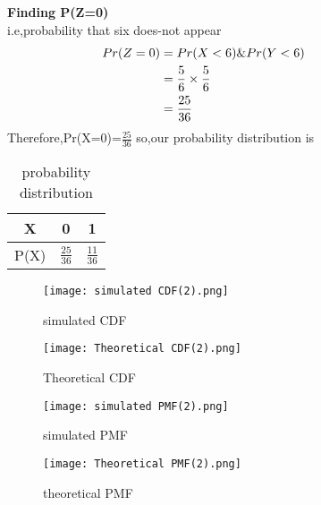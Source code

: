 \documentclass[11pt,a4paper,twocolumn]{article}
\begin{document}
\textbf{Finding P(Z=0)}
\\i.e,probability that six does-not appear
\begin{align*}
\hspace{-3cm}
    Pr(Z=0)&=Pr(X<6)\&Pr(Y<6)\\
    &=\frac{5}{6}\times\frac{5}{6}\\
    &=\frac{25}{36}
\end{align*}
Therefore,Pr(X=0)=$\frac{25}{36}$
so,our probability distribution is
\begin{table}[ht]
    \centering
    \begin{tabular}{|c|c|c|}
    \hline
         X&0&1\\[5pt]
         \hline
         P(X)&$\frac{25}{36}$&$\frac{11}{36}$\\[5pt]
         \hline
    \end{tabular}
    \caption{probability distribution}
    \label{tab:my_label}
\end{table}
\begin{figure}[h!]
    \centering
    \texttt{[image: simulated CDF(2).png]}
    \caption{simulated CDF}
\end{figure}
\begin{figure}[h!]
    \centering
    \texttt{[image: Theoretical CDF(2).png]} 
    \caption{Theoretical CDF}
\end{figure}
\begin{figure}[h!]
    \centering
    \texttt{[image: simulated PMF(2).png]} 
    \caption{simulated PMF}
\end{figure}
\begin{figure}[h!]
    \centering
    \texttt{[image: Theoretical PMF(2).png]}
    \caption{theoretical PMF}
\end{figure}
\end{document}
